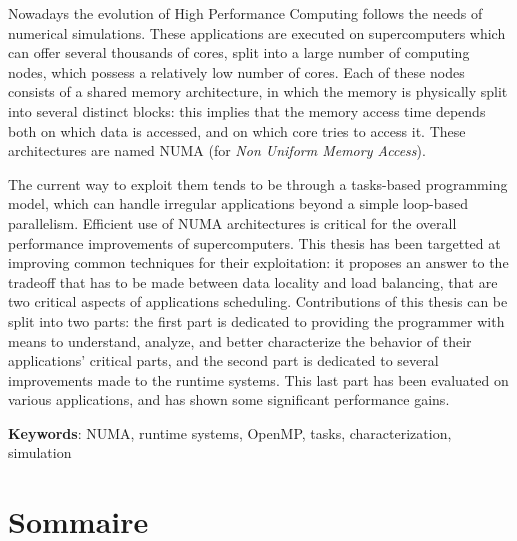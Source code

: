 Nowadays the evolution of High Performance Computing follows the needs of numerical simulations.
These applications are executed on supercomputers which can offer several thousands of cores, split into a large number of computing nodes, which possess a relatively low number of cores.
Each of these nodes consists of a shared memory architecture, in which the memory is physically split into several distinct blocks: this implies that the memory access time depends both on which data is accessed, and on which core tries to access it.
These architectures are named NUMA (for \emph{Non Uniform Memory Access}).

The current way to exploit them tends to be through a tasks-based programming model, which can handle irregular applications beyond a simple loop-based parallelism.
Efficient use of NUMA architectures is critical for the overall performance improvements of supercomputers.
This thesis has been targetted at improving common techniques for their exploitation: it proposes an answer to the tradeoff that has to be made between data locality and load balancing, that are two critical aspects of applications scheduling.
Contributions of this thesis can be split into two parts: the first part is dedicated to providing the programmer with means to understand, analyze, and better characterize the behavior of their applications' critical parts, and the second part is dedicated to several improvements made to the runtime systems.
This last part has been evaluated on various applications, and has shown some significant performance gains.


\quad

\textbf{Keywords}: NUMA, runtime systems, OpenMP, tasks, characterization, simulation




\cleardoublepage
\dominitoc
\makeatletter
\renewcommand{\contentsname}{Sommaire}
\renewcommand{\tableofcontents}[1][\contentsname]{%
  \chapter*{#1}
}
\makeatother
\tableofcontents
